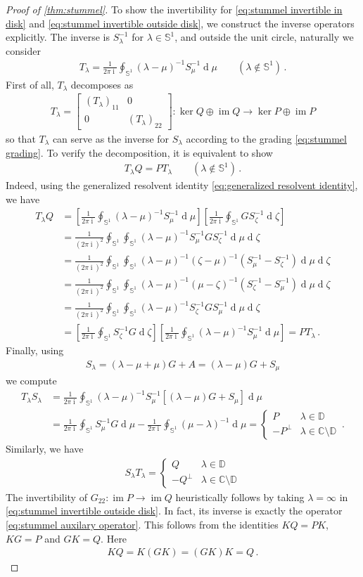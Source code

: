 \documentclass[a4paper,10pt]{article}
\numberwithin{equation}{section}
\theoremstyle{plain}
\theoremstyle{plain}
\theoremstyle{plain}
\theoremstyle{plain}
\theoremstyle{plain}
\theoremstyle{remark}
\theoremstyle{definition}
\theoremstyle{plain}
\newcommand{\ii}{\operatorname{i}}
\newcommand{\bS}{\mathbb{S}}
\newcommand{\CC}{\mathbb{C}}
\newcommand{\dif}{\operatorname{d}}
\newcommand{\im}{\operatorname{im}}
\newcommand{\eq}[1]{\begin{align*}#1\end{align*}}
\newcommand{\eql}[1]{\begin{align}#1\end{align}}
\newcommand{\DD}{\mathbb{D}}
\begin{document}
\begin{proof}[Proof of \cref{thm:stummel}]
			To show the invertibility for \cref{eq:stummel invertible in disk} and \cref{eq:stummel invertible outside disk}, we construct the inverse operators explicitly. The inverse is $S_\lambda^{-1}$ for $\lambda\in\bS^1$, and outside the unit circle, naturally we consider \eql{T_\lambda = \frac{1}{2\pi \ii}\oint_{\bS^1} (\lambda-\mu)^{-1}S_\mu^{-1}\dif{\mu} \qquad (\lambda\notin \bS^1)\,. \label{eq:the inverse T lambda}} First of all, $T_\lambda$ decomposes as \eq{T_\lambda = \begin{bmatrix} (T_\lambda)_{11} & 0 \\ 0 & (T_\lambda)_{22}\end{bmatrix}: \ker Q\oplus \im Q \to \ker P\oplus \im P} so that $T_\lambda$ can serve as the inverse for $S_\lambda$ according to the grading \cref{eq:stummel grading}. To verify the decomposition, it is equivalent to show \eq{T_\lambda Q=PT_\lambda \qquad (\lambda\notin \bS^1)\,.} Indeed, using the generalized resolvent identity \cref{eq:generalized resolvent identity}, we have \eq{T_\lambda Q &= \left[\frac{1}{2\pi \ii}\oint_{\bS^1}(\lambda-\mu)^{-1} S_\mu^{-1} \dif{\mu}\right]\left[ \frac{1}{2\pi \ii} \oint_{\bS^1} GS_\zeta^{-1}\dif{\zeta}\right] \\ &=\frac{1}{(2\pi \ii)^2}\oint_{\bS^1}\oint_{\bS^1} (\lambda-\mu)^{-1}S_\mu^{-1}  GS_\zeta^{-1}\dif{\mu}\dif{\zeta} \\ &= \frac{1}{(2\pi \ii)^2}\oint_{\bS^1}\oint_{\bS^1} (\lambda-\mu)^{-1}(\zeta-\mu)^{-1}(S_\mu^{-1} -S_\zeta^{-1})\dif{\mu}\dif{\zeta} \\ &= \frac{1}{(2\pi \ii)^2}\oint_{\bS^1}\oint_{\bS^1} (\lambda-\mu)^{-1}(\mu-\zeta)^{-1}( S_\zeta^{-1}-S_\mu^{-1})\dif{\mu}\dif{\zeta} \\ &=\frac{1}{(2\pi \ii)^2}\oint_{\bS^1}\oint_{\bS^1} (\lambda-\mu)^{-1} S_\zeta^{-1}GS_\mu^{-1} \dif{\mu}\dif{\zeta} \\ &= \left[\frac{1}{2\pi \ii}\oint_{\bS^1} S_\zeta^{-1} G\dif{\zeta}\right]\left[ \frac{1}{2\pi \ii} \oint_{\bS^1} (\lambda-\mu)^{-1} S_\mu^{-1} \dif{\mu}\right] = PT_\lambda \,.} Finally, using \eq{S_\lambda=(\lambda-\mu+\mu)G+A=(\lambda-\mu)G+S_\mu} we compute \eq{T_\lambda S_\lambda &= \frac{1}{2\pi \ii}\oint_{\bS^1}(\lambda-\mu)^{-1} S_\mu^{-1} \left[(\lambda-\mu)G+S_\mu\right] \dif{\mu} \\ &= \frac{1}{2\pi \ii}\oint_{\bS^1} S_\mu^{-1}G\dif{\mu} - \frac{1}{2\pi \ii}\oint_{\bS^1} (\mu-\lambda)^{-1}\dif{\mu} = \begin{cases}P & \lambda\in \DD \\ -P^\perp & \lambda \in\CC\setminus \DD\end{cases}\,.} 
			Similarly, we have \eq{S_\lambda T_\lambda = \begin{cases}Q & \lambda\in \DD \\ -Q^\perp & \lambda \in\CC\setminus \DD\end{cases}} The invertibility of $G_{22}:\im P\to \im Q$ heuristically follows by taking $\lambda=\infty$ in \cref{eq:stummel invertible outside disk}. In fact, its inverse is exactly the operator \cref{eq:stummel auxilary operator}. This follows from the identities $KQ=PK$, $KG=P$ and $GK=Q$. Here \eq{KQ=K(GK)=(GK)K=Q\,.}
		\end{proof}
		
		
		
		
		
		
		
		\begingroup
		\let\itshape\upshape
		\printbibliography
		\endgroup
	
\end{document}
